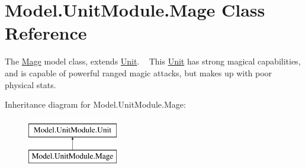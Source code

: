 \hypertarget{class_model_1_1_unit_module_1_1_mage}{}\section{Model.\+Unit\+Module.\+Mage Class Reference}
\label{class_model_1_1_unit_module_1_1_mage}


The \hyperlink{class_model_1_1_unit_module_1_1_mage}{Mage} model class, extends \hyperlink{interface_model_1_1_unit_module_1_1_unit}{Unit}. ~\newline
 This \hyperlink{interface_model_1_1_unit_module_1_1_unit}{Unit} has strong magical capabilities, and is capable of powerful ranged magic attacks, but makes up with poor physical stats.  


Inheritance diagram for Model.\+Unit\+Module.\+Mage\+:\begin{figure}[H]
\begin{center}
\leavevmode
\includegraphics[height=2.000000cm]{class_model_1_1_unit_module_1_1_mage}
\end{center}
\end{figure}
